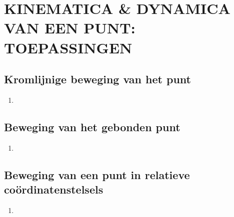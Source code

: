 \documentclass[12pt]{article}
\begin{document}
    \maketitle

    \section{KINEMATICA & DYNAMICA VAN EEN PUNT: TOEPASSINGEN}
    \subsection{Kromlijnige beweging van het punt}
    \begin{enumerate}
        \item 
    \end{enumerate}
    \subsection{Beweging van het gebonden punt}
    \begin{enumerate}
        \item 
    \end{enumerate}
    \subsection{Beweging van een punt in relatieve coördinatenstelsels}
    \begin{enumerate}
        \item 
    \end{enumerate}
\end{document}
